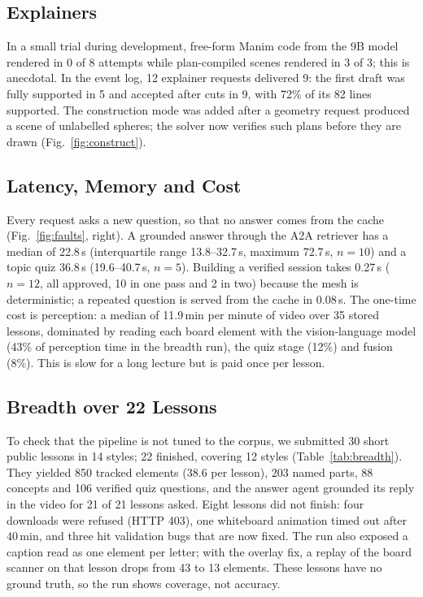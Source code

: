 \documentclass[9pt,a4paper]{extarticle}
\newcommand{\fig}[1]{Fig.~\ref{#1}}
\newcommand{\tab}[1]{Table~\ref{#1}}
\begin{document}
\subsection{Explainers}
In a small trial during development, free-form Manim code from the 9B model rendered in 0 of 8 attempts while
plan-compiled scenes rendered in 3 of 3; this is anecdotal. In the event log, 12 explainer requests delivered 9: the
first draft was fully supported in 5 and accepted after cuts in 9, with 72\% of its 82 lines supported. The
construction mode was added after a geometry request produced a scene of unlabelled spheres; the solver now verifies
such plans before they are drawn (\fig{fig:construct}).

\subsection{Latency, Memory and Cost}
Every request asks a new question, so that no answer comes from the cache (\fig{fig:faults}, right). A grounded answer
through the A2A retriever has a median of 22.8\,s (interquartile range 13.8--32.7\,s, maximum 72.7\,s, $n=10$) and a
topic quiz 36.8\,s (19.6--40.7\,s, $n=5$). Building a verified session takes 0.27\,s ($n=12$, all approved, 10 in one
pass and 2 in two) because the mesh is deterministic; a repeated question is served from the cache in 0.08\,s. The
one-time cost is perception: a median of 11.9\,min per minute of video over 35 stored lessons, dominated by reading each
board element with the vision-language model (43\% of perception time in the breadth run), the quiz stage (12\%) and
fusion (8\%). This is slow for a long lecture but is paid once per lesson.

\subsection{Breadth over 22 Lessons}
To check that the pipeline is not tuned to the corpus, we submitted 30 short public lessons in 14 styles; 22 finished,
covering 12 styles (\tab{tab:breadth}). They yielded 850 tracked elements (38.6 per lesson), 203 named parts, 88
concepts and 106 verified quiz questions, and the answer agent grounded its reply in the video for 21 of 21 lessons
asked. Eight lessons did not finish: four downloads were refused (HTTP 403), one whiteboard animation timed out after
40\,min, and three hit validation bugs that are now fixed. The run also exposed a caption read as one element per
letter; with the overlay fix, a replay of the board scanner on that lesson drops from 43 to 13 elements. These lessons
have no ground truth, so the run shows coverage, not accuracy.
\end{document}

